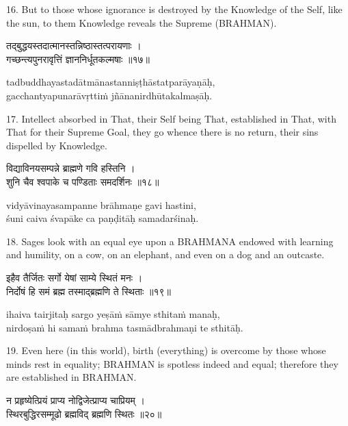 16. But to those whose ignorance is destroyed by the Knowledge of the Self,
like the sun, to them Knowledge reveals the Supreme (BRAHMAN).

\begin{gitaverse}
तद्बुद्धयस्तदात्मानस्तन्निष्ठास्तत्परायणाः । \\
गच्छन्त्यपुनरावृत्तिं ज्ञाननिर्धूतकल्मषाः ॥१७॥
\end{gitaverse}

\begin{transliteration}
tadbuddhayastadātmānastanniṣṭhāstatparāyaṇāḥ, \\
gacchantyapunarāvṛttiṁ jñānanirdhūtakalmaṣāḥ.
\end{transliteration}

17. Intellect absorbed in That, their Self being That, established in That,
with That for their Supreme Goal, they go whence there is no return, their sins
dispelled by Knowledge.

\begin{gitaverse}
विद्याविनयसम्पन्ने ब्राह्मणे गवि हस्तिनि । \\
शुनि चैव श्वपाके च पण्डिताः समदर्शिनः ॥१८॥
\end{gitaverse}

\begin{transliteration}
vidyāvinayasampanne brāhmaṇe gavi hastini, \\
śuni caiva śvapāke ca paṇḍitāḥ samadarśinaḥ.
\end{transliteration}

18. Sages look with an equal eye upon a BRAHMANA endowed with learning and
humility, on a cow, on an elephant, and even on a dog and an outcaste.

\begin{gitaverse}
इहैव तैर्जितः सर्गो येषां साम्ये स्थितं मनः । \\
निर्दोषं हि समं ब्रह्म तस्माद्ब्रह्मणि ते स्थिताः ॥१९॥
\end{gitaverse}

\begin{transliteration}
ihaiva tairjitaḥ sargo yeṣāṁ sāmye sthitaṁ manaḥ, \\
nirdoṣaṁ hi samaṁ brahma tasmādbrahmaṇi te sthitāḥ.
\end{transliteration}

19. Even here (in this world), birth (everything) is overcome by those whose
minds rest in equality; BRAHMAN is spotless indeed and equal; therefore they
are established in BRAHMAN.\@

\begin{gitaverse}
न प्रहृष्येत्प्रियं प्राप्य नोद्विजेत्प्राप्य चाप्रियम् । \\
स्थिरबुद्धिरसम्मूढो ब्रह्मविद् ब्रह्मणि स्थितः ॥२०॥
\end{gitaverse}

